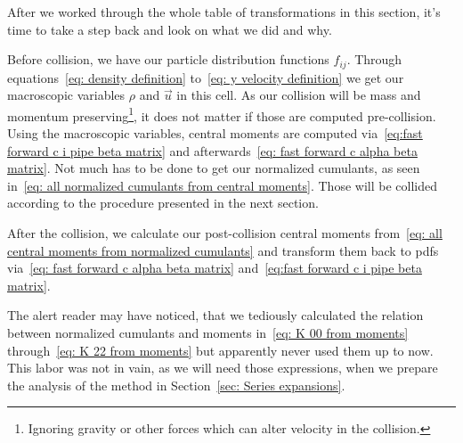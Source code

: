 
After we worked through the whole table of transformations in this section, it's time to take a step back and look on what we did and why.

Before collision, we have our particle distribution functions $f_{ij}$.
Through equations~\eqref{eq: density definition} to~\eqref{eq: y velocity definition} we get our macroscopic variables $\rho$ and $\vec{u}$ in this cell.
As our collision will be mass and momentum preserving\footnote{Ignoring gravity or other forces which can alter velocity in the collision.}, it does not matter if those are computed pre-collision.
Using the macroscopic variables, central moments are computed via~\eqref{eq:fast forward c i pipe beta matrix} and afterwards~\eqref{eq: fast forward c alpha beta matrix}.
Not much has to be done to get our normalized cumulants, as seen in~\eqref{eq: all normalized cumulants from central moments}.
Those will be collided according to the procedure presented in the next section.

After the collision, we calculate our post-collision central moments from~\eqref{eq: all central moments from normalized cumulants}
and transform them back to \glspl{pdf} via~\eqref{eq: fast forward c alpha beta matrix} and~\eqref{eq:fast forward c i pipe beta matrix}.

The alert reader may have noticed, that we tediously calculated the relation between normalized cumulants and moments in~\eqref{eq: K 00 from moments} through~\eqref{eq: K 22 from moments} but apparently never used them up to now.
This labor was not in vain, as we will need those expressions, when we prepare the analysis of the method in Section~\ref{sec: Series expansions}.
